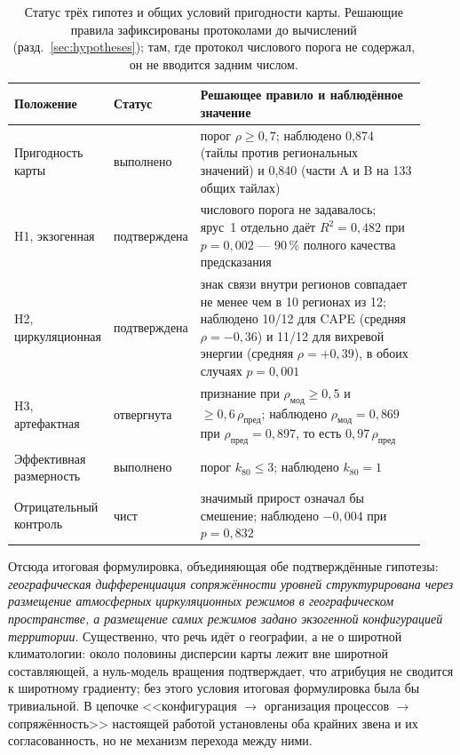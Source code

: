 \documentclass[11pt,a4paper]{article}
\begin{document}
\begin{table}[t]
\centering
\caption{Статус трёх гипотез и общих условий пригодности карты. Решающие правила зафиксированы протоколами до вычислений (разд.~\ref{sec:hypotheses}); там, где протокол числового порога не содержал, он не вводится задним числом.}
\label{tab:hyp}
\small
\begin{tabular}{@{}p{0.20\linewidth}p{0.15\linewidth}p{0.57\linewidth}@{}}
\toprule
Положение & Статус & Решающее правило и наблюдённое значение\\
\midrule
Пригодность карты & выполнено & порог $\rho\ge0{,}7$; наблюдено 0,874 (тайлы против региональных значений) и 0,840 (части A и B на 133 общих тайлах)\\
H1, экзогенная & подтверждена & числового порога не задавалось; ярус~1 отдельно даёт $R^2=0{,}482$ при $p=0{,}002$ --- 90\,\% полного качества предсказания\\
H2, циркуляционная & подтверждена & знак связи внутри регионов совпадает не менее чем в 10 регионах из 12; наблюдено 10/12 для CAPE (средняя $\rho=-0{,}36$) и 11/12 для вихревой энергии (средняя $\rho=+0{,}39$), в обоих случаях $p=0{,}001$\\
H3, артефактная & отвергнута & признание при $\rho_{\mathrm{мод}}\ge0{,}5$ и $\ge0{,}6\,\rho_{\mathrm{пред}}$; наблюдено $\rho_{\mathrm{мод}}=0{,}869$ при $\rho_{\mathrm{пред}}=0{,}897$, то есть $0{,}97\,\rho_{\mathrm{пред}}$\\
Эффективная размерность & выполнено & порог $k_{80}\le3$; наблюдено $k_{80}=1$\\
Отрицательный контроль & чист & значимый прирост означал бы смешение; наблюдено $-0{,}004$ при $p=0{,}832$\\
\bottomrule
\end{tabular}
\end{table}


Отсюда итоговая формулировка, объединяющая обе подтверждённые гипотезы: \emph{географическая дифференциация сопряжённости уровней структурирована через размещение атмосферных циркуляционных режимов в географическом пространстве, а размещение самих режимов задано экзогенной конфигурацией территории}. Существенно, что речь идёт о географии, а не о широтной климатологии: около половины дисперсии карты лежит вне широтной составляющей, а нуль-модель вращения подтверждает, что атрибуция не сводится к широтному градиенту; без этого условия итоговая формулировка была бы тривиальной. В цепочке <<конфигурация $\to$ организация процессов $\to$ сопряжённость>> настоящей работой установлены оба крайних звена и их согласованность, но не механизм перехода между ними.
\end{document}

